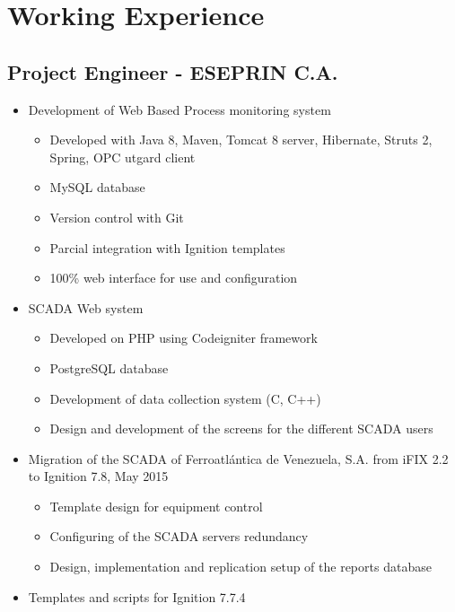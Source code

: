 \documentclass[letterpaper,11pt]{report}
\begin{document}
\section*{Working Experience}

\subsection*{Project Engineer - ESEPRIN C.A.}
  \begin{itemize}
    \item Development of Web Based Process monitoring system
        \begin{itemize}
        \item Developed with Java 8, Maven, Tomcat 8 server, Hibernate, Struts 2, Spring, OPC utgard client
        \item MySQL database
        \item Version control with Git
        \item Parcial integration with Ignition templates
        \item 100\% web interface for use and configuration
        \end{itemize}
    \item SCADA Web system
        \begin{itemize}
        \item Developed on PHP using Codeigniter framework
        \item PostgreSQL database
        \item Development of data collection system (C, C++)
        \item Design and development of the screens for the different SCADA users
        \end{itemize}
    \item Migration of the SCADA of Ferroatlántica de Venezuela, S.A. from iFIX 2.2 to Ignition 7.8, May 2015
        \begin{itemize}
            \item Template design for equipment control
            \item Configuring of the SCADA servers redundancy
            \item Design, implementation and replication setup of the reports database
        \end{itemize}
    \item Templates and scripts for Ignition 7.7.4
    

\end{itemize}
\end{document}
